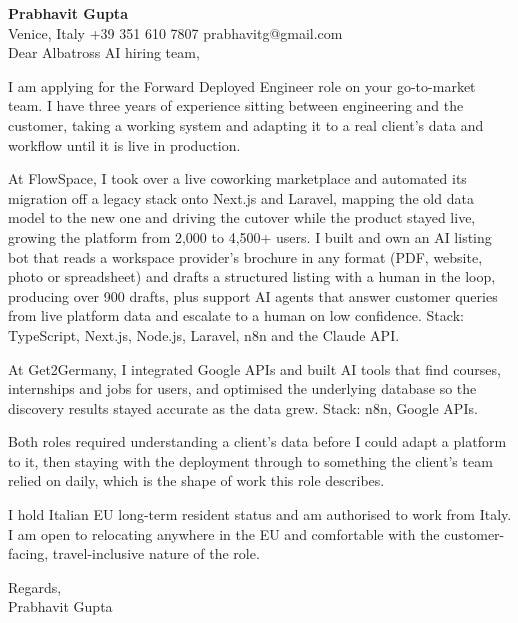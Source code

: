 \documentclass[a4paper,10.5pt]{article}
\begin{document}
\textbf{Prabhavit Gupta}\\
Venice, Italy \textbar{} +39 351 610 7807 \textbar{} prabhavitg@gmail.com\\[10pt]
Dear Albatross AI hiring team,

I am applying for the Forward Deployed Engineer role on your go-to-market team. I have three years of experience sitting between engineering and the customer, taking a working system and adapting it to a real client's data and workflow until it is live in production.

At FlowSpace, I took over a live coworking marketplace and automated its migration off a legacy stack onto Next.js and Laravel, mapping the old data model to the new one and driving the cutover while the product stayed live, growing the platform from 2,000 to 4,500+ users. I built and own an AI listing bot that reads a workspace provider's brochure in any format (PDF, website, photo or spreadsheet) and drafts a structured listing with a human in the loop, producing over 900 drafts, plus support AI agents that answer customer queries from live platform data and escalate to a human on low confidence. Stack: TypeScript, Next.js, Node.js, Laravel, n8n and the Claude API.

At Get2Germany, I integrated Google APIs and built AI tools that find courses, internships and jobs for users, and optimised the underlying database so the discovery results stayed accurate as the data grew. Stack: n8n, Google APIs.

Both roles required understanding a client's data before I could adapt a platform to it, then staying with the deployment through to something the client's team relied on daily, which is the shape of work this role describes.

I hold Italian EU long-term resident status and am authorised to work from Italy. I am open to relocating anywhere in the EU and comfortable with the customer-facing, travel-inclusive nature of the role.

Regards,\\
Prabhavit Gupta
\end{document}
